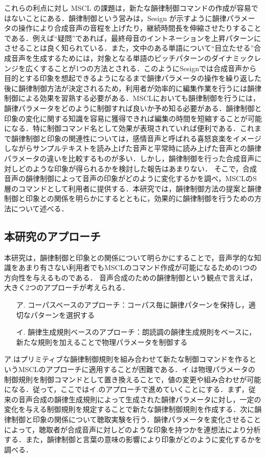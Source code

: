 \documentclass[japanese]{jnlp_1.4}
\begin{document}
これらの利点に対し MSCL の課題は，新たな韻律制御コマンドの作成が容易ではないことにある．韻律制御という営みは，Sesign \cite{Sesign}が示すように韻律パラメータの操作により合成音声の音程を上げたり，継続時間長を伸縮させたりすることである．例えば“疑問”であれば，最終母音のイントネーションを上昇パターンにさせることは良く知られている．また，文中のある単語について“目立たせる”合成音声を生成するためには，対象となる単語のピッチパターンのダイナミックレンジを広くすることが1つの方法\cite{Iwata}とされる．このようにSesignでは合成音声から目的とする印象を想起できるようになるまで韻律パラメータの操作を繰り返した後に韻律制御方法が決定されるため，利用者が効率的に編集作業を行うには韻律制御による効果を習熟する必要がある．MSCLにおいても韻律制御を行うには，韻律パラメータをどのように制御すれば良いか予め知る必要がある．韻律制御と印象の変化に関する知識を容易に獲得できれば編集の時間を短縮することが可能になる．特に制御コマンド名として効果が表現されていれば便利である．これまで韻律制御と印象の関連性については，感情音声と呼ばれる喜怒哀楽をイメージしながらサンプルテキストを読み上げた音声と平常時に読み上げた音声との韻律パラメータの違いを比較するものが多い\cite{Hirose,Arimoto}．しかし，韻律制御を行った合成音声に対しどのような印象が得られるかを検討した報告はあまりない． そこで，合成音声の韻律制御によって音声の印象がどのように変化するかを調べ，MSCLのS層のコマンドとして利用者に提供する．本研究では，韻律制御方法の提案と韻律制御と印象との関係を明らかにするとともに，効果的に韻律制御を行うための方法について述べる．


\subsection{本研究のアプローチ}

本研究は，韻律制御と印象との関係について明らかにすることで，音声学的な知識をあまり有さない利用者でもMSCLのコマンド作成が可能になるための1つの方向性を与えるものである．
音声合成のための韻律制御という観点で言えば，大きく2つのアプローチが考えられる．

\begin{itemize}
	\item[ア.] コーパスベースのアプローチ：コーパス毎に韻律パターンを保持し，適切なパターンを選択する\cite{Corpus}
	\item[イ.]韻律生成規則ベースのアプローチ：朗読調の韻律生成規則をベースに，新たな規則を加えることで物理パラメータを制御する
\end{itemize}

ア.はプリミティブな韻律制御規則を組み合わせて新たな制御コマンドを作るというMSCLのアプローチに適用することが困難である．イ.は物理パラメータの制御規則を制御コマンドとして置き換えることで，値の変更や組み合わせが可能になる．従って，ここではイ.のアプローチで進めていくことにする．まず，従来の音声合成の韻律生成規則によって生成された韻律パラメータに対し，一定の変化を与える制御規則を規定することで新たな韻律制御規則を作成する．次に韻律制御と印象の関係について聴取実験を行う．韻律パラメータを変化させることによって，聴取者が合成音声に対しどのような印象を持つかを連想法により分析する．また，韻律制御と言葉の意味の影響により印象がどのように変化するかを調べる．
\end{document}
